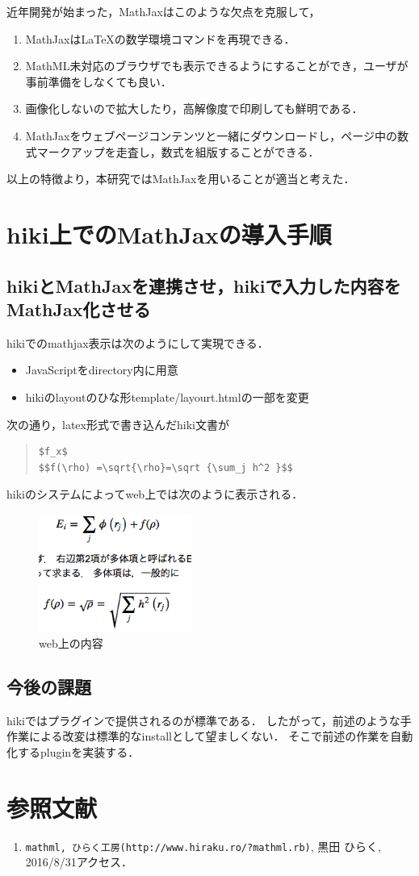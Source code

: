 \documentclass[10pt,a4j,twocolumn]{jsarticle}
\begin{document}
近年開発が始まった，MathJaxはこのような欠点を克服して，
\begin{enumerate}
\item MathJaxはLaTeXの数学環境コマンドを再現できる．
\item MathML未対応のブラウザでも表示できるようにすることができ，ユーザが事前準備をしなくても良い．
\item 画像化しないので拡大したり，高解像度で印刷しても鮮明である．
\item MathJaxをウェブページコンテンツと一緒にダウンロードし，ページ中の数式マークアップを走査し，数式を組版することができる．
\end{enumerate}
以上の特徴より，本研究ではMathJaxを用いることが適当と考えた．

\section{hiki上でのMathJaxの導入手順}
\subsection{hikiとMathJaxを連携させ，hikiで入力した内容をMathJax化させる}
hikiでのmathjax表示は次のようにして実現できる．
\begin{itemize}
\item JavaScriptをdirectory内に用意
\item hikiのlayoutのひな形template/layourt.htmlの一部を変更
\end{itemize}
次の通り，latex形式で書き込んだhiki文書が
\begin{quote}\begin{verbatim}
$f_x$
$$f(\rho) =\sqrt{\rho}=\sqrt {\sum_j h^2 }$$
\end{verbatim}\end{quote}
hikiのシステムによってweb上では次のように表示される．


\begin{figure}[h]
  \centering
  \includegraphics[width=5cm]{Math_test3.png}
  \caption{web上の内容}
\end{figure}

\subsection{今後の課題}
hikiではプラグインで提供されるのが標準である．
したがって，前述のような手作業による改変は標準的なinstallとして望ましくない．
そこで前述の作業を自動化するpluginを実装する．

\section{参照文献}\begin{enumerate}
\item\verb|mathml, ひらく工房(http://www.hiraku.ro/?mathml.rb)|, 黒田 ひらく, 2016/8/31アクセス．
\end{enumerate}
\end{document}
